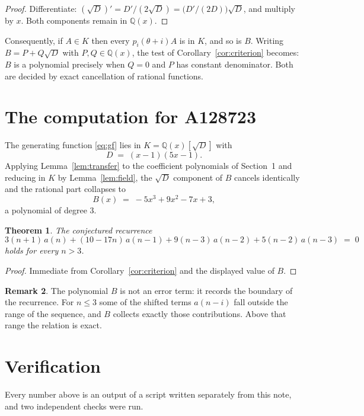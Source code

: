 \documentclass[11pt,a4paper]{article}
\theoremstyle{plain}
\newtheorem{theorem}{Theorem}
\theoremstyle{definition}
\newtheorem{remark}[theorem]{Remark}
\begin{document}
\begin{proof}
Differentiate: $(\sqrt{D})'=D'/(2\sqrt{D})=\bigl(D'/(2D)\bigr)\sqrt{D}$, and multiply by
$x$. Both components remain in $\mathbb{Q}(x)$.
\end{proof}

Consequently, if $A\in K$ then every $p_{i}(\theta+i)A$ is in $K$, and so is $B$. Writing
$B=P+Q\sqrt{D}$ with $P,Q\in\mathbb{Q}(x)$, the test of Corollary~\ref{cor:criterion}
becomes: $B$ is a polynomial precisely when $Q=0$ and $P$ has constant denominator. Both
are decided by exact cancellation of rational functions.

\section{The computation for A128723}

The generating function \eqref{eq:gf} lies in $K=\mathbb{Q}(x)[\sqrt{D}]$ with
\[
D \;=\; \left(x - 1\right) \left(5 x - 1\right) .
\]
Applying Lemma~\ref{lem:transfer} to the coefficient polynomials of Section~1 and reducing
in $K$ by Lemma~\ref{lem:field}, the $\sqrt{D}$ component of $B$ cancels identically and
the rational part collapses to
\[
B(x)\;=\;- 5 x^{3} + 9 x^{2} - 7 x + 3 ,
\]
a polynomial of degree $3$.

\begin{theorem}
The conjectured recurrence
\[
3 \left(n + 1\right)\,a(n) + (10 - 17 n)\,a(n-1) + 9 \left(n - 3\right)\,a(n-2) + 5 \left(n - 2\right)\,a(n-3) \;=\;0
\]
holds for every $n>3$.
\end{theorem}

\begin{proof}
Immediate from Corollary~\ref{cor:criterion} and the displayed value of $B$.
\end{proof}

\begin{remark}
The polynomial $B$ is not an error term: it records the boundary of the recurrence. For
$n\le3$ some of the shifted terms $a(n-i)$ fall outside the range of the sequence,
and $B$ collects exactly those contributions. Above that range the relation is exact.
\end{remark}

\section{Verification}

Every number above is an output of a script written separately from this note, and two
independent checks were run.
\end{document}

